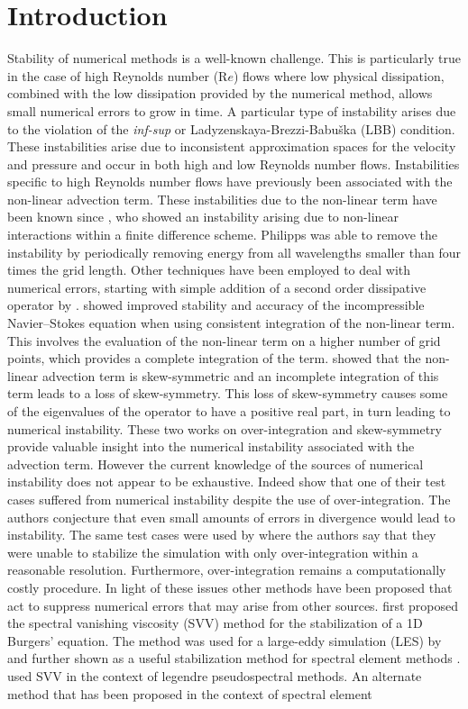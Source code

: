 
\section{Introduction}

 Stability of numerical methods is a well-known challenge. This is particularly true in the case of high Reynolds number (R$e$) flows where low physical dissipation, combined with the low dissipation provided by the numerical method, allows small numerical errors to grow in time. A particular type of instability arises  due to the violation of the \emph{inf-sup} or Ladyzenskaya-Brezzi-Babu\v{s}ka (LBB) condition. These instabilities arise due to inconsistent approximation spaces for the velocity and pressure and occur in both high and low Reynolds number flows. Instabilities specific to high Reynolds number flows have previously been associated with the non-linear advection term. These instabilities due to the non-linear term have been known since \cite{phillips59}, who showed an instability arising due to non-linear interactions within a finite difference scheme. Philipps was able to remove the instability by periodically removing energy from all wavelengths smaller than four times the grid length. Other techniques have been employed to deal with numerical errors, starting with simple addition of a second order dissipative operator by \cite{vonneumann50}. \cite{kirby03} showed improved stability and accuracy of the incompressible Navier--Stokes equation when using consistent integration of the non-linear term. This involves the evaluation of the non-linear term on a higher number of grid points, which provides a complete integration of the term. \cite{malm13} showed that the non-linear advection term is skew-symmetric and an incomplete integration of this term leads to a loss of skew-symmetry. This loss of skew-symmetry causes some of the eigenvalues of the operator to have a positive real part, in turn leading to numerical instability. These two works on over-integration and skew-symmetry provide valuable insight into the numerical instability associated with the advection term. However the current knowledge of the sources of numerical instability does not appear to be exhaustive. Indeed \cite{malm13} show that one of their test cases suffered from numerical instability despite the use of over-integration. The authors conjecture that even small amounts of errors in divergence would lead to instability. The same test cases were used by \cite{fischer01} where the authors say that they were unable to stabilize the simulation with only over-integration within a reasonable resolution. Furthermore, over-integration remains a computationally costly procedure. In light of these issues other methods have been proposed that act to suppress numerical errors that may arise from other sources. \cite{tadmor89} first proposed the spectral vanishing viscosity (SVV) method for the stabilization of a 1D Burgers' equation. The method was used for a large-eddy simulation (LES) by \cite{karamanos00} and further shown as a useful stabilization method for spectral element methods \citep{kirby06}. \cite{maday93} used SVV in the context of legendre pseudospectral methods. An alternate method that has been proposed in the context of spectral element 
